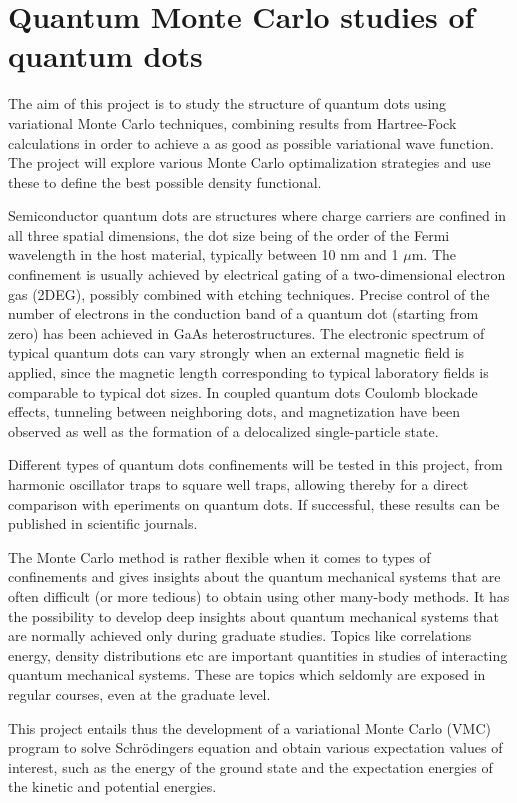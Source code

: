 \documentclass[oneside,final,a4wide,10pt]{article}
\begin{document}
\section*{Quantum Monte Carlo studies of quantum dots}

The aim of this project is to study the structure of quantum dots using
variational  Monte Carlo techniques, combining results
from Hartree-Fock calculations in order to achieve a as good as possible
variational wave function. The project will explore various Monte Carlo
optimalization strategies and use these to define the best possible density functional.

Semiconductor quantum dots are structures where
charge carriers are confined in all three spatial dimensions, 
the dot size being of the order of the Fermi wavelength 
in the host material, typically between  10 nm and  1 $\mu$m.
The confinement is usually achieved by electrical gating of a 
two-dimensional electron gas (2DEG), 
possibly combined with etching techniques. Precise control of the
number of electrons in the conduction band of a quantum dot 
(starting from zero) has been achieved in GaAs heterostructures. 
The electronic spectrum of typical quantum dots
can vary strongly when an external magnetic field is applied, 
since the magnetic length corresponding to typical 
laboratory fields  is comparable to typical dot sizes.
In coupled quantum dots Coulomb blockade effects, 
tunneling between neighboring dots, and magnetization 
have been observed as well as the formation of a
delocalized single-particle state. 

Different types of quantum dots confinements will be tested in this project, from
harmonic oscillator traps to square well traps, allowing thereby for a direct comparison with eperiments on quantum dots. If successful, these results can be published in scientific journals.

The Monte Carlo method
is rather flexible when it comes to types of confinements and gives insights about the quantum mechanical systems that are often difficult (or more tedious) to obtain using other many-body methods.
It has the possibility to develop deep insights about quantum mechanical systems that are normally achieved only during graduate studies. Topics like correlations energy, density distributions etc are important quantities in studies of interacting quantum mechanical systems. These are topics which seldomly are exposed in regular courses, even at the graduate level. 

This project 
entails thus the development of a variational Monte Carlo (VMC)
program to solve Schr\"odingers equation
and obtain various expectation values of interest, such as the energy
of the ground state and the expectation energies of the kinetic and potential energies.
\end{document}
